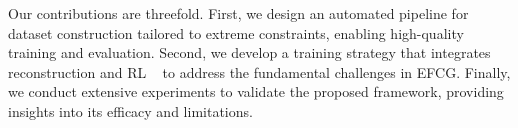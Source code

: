 
Our contributions are threefold. First, we design an automated pipeline for dataset construction tailored to extreme constraints, enabling high-quality training and evaluation. Second, we develop a training strategy that integrates reconstruction and RL ~\cite{rafailov2024direct} to address the fundamental challenges in EFCG. Finally, we conduct extensive experiments to validate the proposed framework, providing insights into its efficacy and limitations. 


